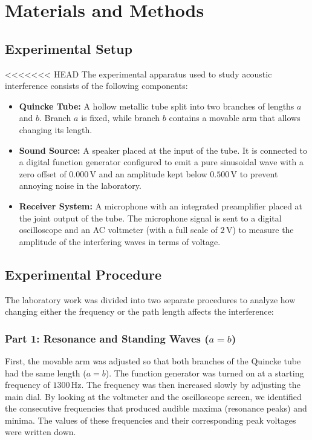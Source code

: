 \documentclass[a4paper,11pt]{article}
\begin{document}
\section{Materials and Methods}

\subsection{Experimental Setup}
<<<<<<< HEAD
The experimental apparatus used to study acoustic interference consists of the following components:
\begin{itemize}
    \item \textbf{Quincke Tube:} A hollow metallic tube split into two branches of lengths $a$ and $b$. Branch $a$ is fixed, while branch $b$ contains a movable arm that allows changing its length.
    \item \textbf{Sound Source:} A speaker placed at the input of the tube. It is connected to a digital function generator configured to emit a pure sinusoidal wave with a zero offset of \ensuremath{0.000\,\mathrm{V}} and an amplitude kept below \ensuremath{0.500\,\mathrm{V}} to prevent annoying noise in the laboratory.
    \item \textbf{Receiver System:} A microphone with an integrated preamplifier placed at the joint output of the tube. The microphone signal is sent to a digital oscilloscope and an AC voltmeter (with a full scale of \ensuremath{2\,\mathrm{V}}) to measure the amplitude of the interfering waves in terms of voltage.
\end{itemize}

\subsection{Experimental Procedure}
The laboratory work was divided into two separate procedures to analyze how changing either the frequency or the path length affects the interference:

\subsubsection{Part 1: Resonance and Standing Waves ($a = b$)}
First, the movable arm was adjusted so that both branches of the Quincke tube had the same length ($a = b$). The function generator was turned on at a starting frequency of \ensuremath{1300\,\mathrm{Hz}}. The frequency was then increased slowly by adjusting the main dial. By looking at the voltmeter and the oscilloscope screen, we identified the consecutive frequencies that produced audible maxima (resonance peaks) and minima. The values of these frequencies and their corresponding peak voltages were written down.
\end{document}

